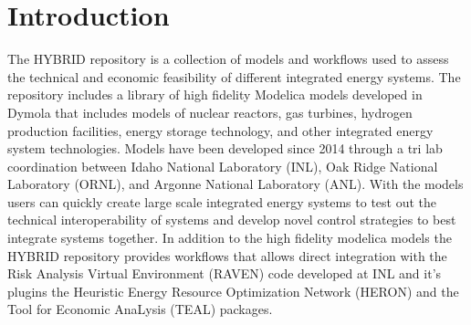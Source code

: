 \section{Introduction}
The HYBRID repository is a collection of models and workflows used to assess the technical and economic
feasibility of different integrated energy systems. The repository includes a library of high fidelity
Modelica models developed in Dymola that includes models of nuclear reactors, gas turbines, hydrogen
production facilities, energy storage technology, and other integrated energy system technologies. Models
have been developed since 2014 through a tri lab coordination between Idaho National Laboratory (INL),
Oak Ridge National Laboratory (ORNL), and Argonne National Laboratory (ANL). With the models users can
quickly create large scale integrated energy systems to test out the technical interoperability of systems
and develop novel control strategies to best integrate systems together. In addition to the high fidelity modelica
models the HYBRID repository provides workflows that allows direct integration with the Risk Analysis Virtual
Environment (RAVEN) code developed at INL and it’s plugins the Heuristic Energy Resource Optimization Network
(HERON) and the Tool for Economic AnaLysis (TEAL) packages.
